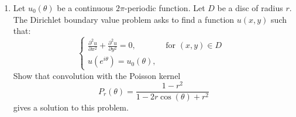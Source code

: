\documentclass[a4paper,10pt]{article}
\begin{document}
\begin{enumerate}
\item Let $u_0(\theta)$ be a continuous $2\pi$-periodic function. 
Let $D$ be a disc of radius $r$. 
The Dirichlet boundary value problem asks to find a function $u(x,y)$ such that:
  $$ \begin{cases}
     \frac{\partial^2 u}{\partial x^2} + \frac{\partial^2 u}{\partial y^2} =0, & \mbox{ for $(x,y)\in D$ } \\
	 u(e^{i\theta})= u_0(\theta), & 
     \end{cases}
     $$
Show that convolution with the Poisson kernel 
 $$P_r(\theta) = \frac{1-r^2}{1-2r\cos(\theta) + r^2}$$
gives a solution to this problem. 




\end{enumerate}
\end{document}
